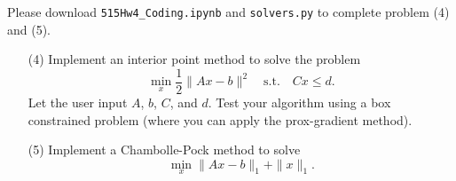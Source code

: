\documentclass[11pt]{amsart}
\begin{document}
\newpage
{}
\vskip 8pt \noindent
Please download \texttt{515Hw4\_Coding.ipynb} and \texttt{solvers.py} to complete problem (4) and (5).
\vskip 8pt

\begin{enumerate}

\item[(4)] Implement an interior point method to solve the problem 
\[
\min_x \frac{1}{2}\|Ax-b\|^2 \quad \mbox{s.t.} \quad Cx \leq d. 
\]
Let the user input $A$, $b$, $C$, and $d$. Test your algorithm using a box constrained problem 
(where you can apply the prox-gradient method). 

\bigskip\bigskip\bigskip






\bigskip\bigskip\bigskip



\item[(5)] Implement a Chambolle-Pock method to solve  
\[
\min_{x} \|Ax-b\|_1 + \|x\|_1. 
\]





\end{enumerate}
\end{document}
